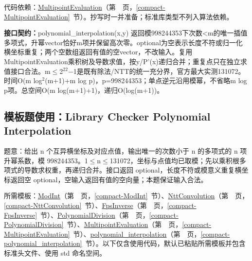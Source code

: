 代码依赖：\hyperref[compact-MultipointEvaluation]{MultipointEvaluation}（第~\pageref{compact-MultipointEvaluation}~页，\ref{compact-MultipointEvaluation}~节）。抄写时一并准备；标准库类型不列入算法依赖。

{\sloppy{}\noindent\textbf{接口契约：}polynomial\_interpolation(x,y) 返回模998244353下次数<m的唯一插值多项式，升幂vector恰好m项并保留高次零。optional为空表示长度不符或归一化横坐标重复；两个空数组返回有值的空vector，不改输入。复用MultipointEvaluation乘积树及导数求值，按y/P'(x)递归合并；重复点只在独立求值接口合法。m$\le$2$^{22}$−1是既有除法/NTT的统一充分界，官方最大实测131072。时间O(m log$^{2}$(m+1)+m log p)，p=998244353；单点逆元沿用模幂，不省略m log p项。总空间O(m log(m+1)+1)，递归O(log(m+1))。\par}



\Needspace{457pt}

\subsection*{模板题使用：Library Checker Polynomial Interpolation}

\label{usage-example-212}

题意：给出 n 个互异横坐标及对应点值，输出唯一的次数小于 n 的多项式的 n 项升幂系数，模 998244353。1$\le$n$\le$131072，坐标与点值均已取模；先以乘积根多项式的导数求权重，再递归合并。接口返回 optional，长度不符或模意义重复横坐标返回空 optional，空输入返回有值的空向量；本题保证输入合法。

所需模板：\hyperref[compact-ModInt]{ModInt}（第~\pageref{compact-ModInt}~页，\ref{compact-ModInt}~节）、\hyperref[compact-NttConvolution]{NttConvolution}（第~\pageref{compact-NttConvolution}~页，\ref{compact-NttConvolution}~节）、\hyperref[compact-FpsInverse]{FpsInverse}（第~\pageref{compact-FpsInverse}~页，\ref{compact-FpsInverse}~节）、\hyperref[compact-PolynomialDivision]{PolynomialDivision}（第~\pageref{compact-PolynomialDivision}~页，\ref{compact-PolynomialDivision}~节）、\hyperref[compact-MultipointEvaluation]{MultipointEvaluation}（第~\pageref{compact-MultipointEvaluation}~页，\ref{compact-MultipointEvaluation}~节）、\hyperref[compact-polynomial_interpolation]{polynomial\_\allowbreak{}interpolation}（第~\pageref{compact-polynomial_interpolation}~页，\ref{compact-polynomial_interpolation}~节）。以下仅含使用代码，默认已粘贴所需模板并包含标准头文件、使用 std 命名空间。

